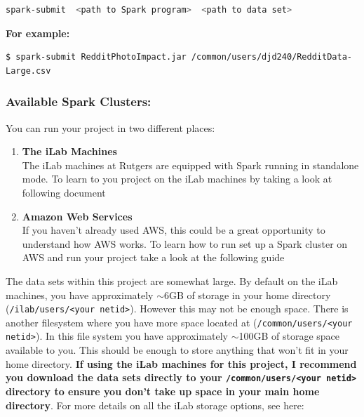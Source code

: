 \documentclass{article}
\begin{document}
\vspace{0.1cm}
\begin{lstlisting}[language=bash]
        spark-submit  <path to Spark program>  <path to data set>
\end{lstlisting}
\vspace{0.1cm}

\noindent \textbf{For example:}
\begin{commandline}
\begin{verbatim}$ spark-submit RedditPhotoImpact.jar /common/users/djd240/RedditData-Large.csv
\end{verbatim}
\end{commandline}

\subsubsection*{Available Spark Clusters:}
You can run your project in two different places:
\begin{enumerate}
    \item \textbf{The iLab Machines}\\ 
    The iLab machines at Rutgers are equipped with Spark running in standalone mode. To learn to you project on the iLab machines by taking a look at following document
    \item \textbf{Amazon Web Services}\\
    If you haven't already used AWS, this could be a great opportunity to understand how AWS works. 
To learn how to run set up a Spark cluster on AWS and run your project take a look at the following guide
\end{enumerate}

\begin{info}
The data sets within this project are somewhat large. By default on the iLab machines, you have approximately $\sim$6GB of storage in your home directory (\texttt{/ilab/users/<your netid>}). However this may not be enough space. There is another filesystem where you have more space located at (\texttt{/common/users/<your netid>}). In this file system you have approximately $\sim$100GB of storage space available to you. This should be enough to store anything that won't fit in your home directory. \textbf{If using the iLab machines for this project, I recommend you download the data sets directly to your \texttt{/common/users/<your netid>} directory to ensure you don't take up space in your main home directory}. For more details on all the iLab storage options, see here: \href{https://resources.cs.rutgers.edu/docs/file-storage/storage-technology-options/}{\color{blue}{https://resources.cs.rutgers.edu/docs/file-storage/storage-technology-options/}}
\end{info}
\end{document}
